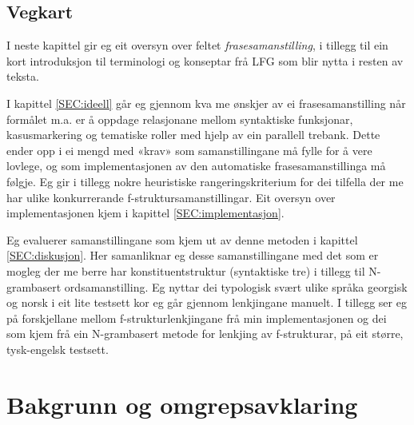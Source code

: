 \documentclass[12pt,a4paper,oneside,draft]{report}
\begin{document}
\section{Vegkart}
\label{sec-1.1}

I neste kapittel gir eg eit oversyn over feltet \emph{frasesamanstilling},
i tillegg til ein kort introduksjon til terminologi og konseptar frå
LFG som blir nytta i resten av teksta.

I kapittel \ref{SEC:ideell} går eg gjennom kva me ønskjer av ei
frasesamanstilling når formålet m.a. er å oppdage relasjonane mellom
syntaktiske funksjonar, kasusmarkering og tematiske roller med hjelp
av ein parallell trebank. Dette ender opp i ei mengd med «krav» som
samanstillingane må fylle for å vere lovlege, og som implementasjonen
av den automatiske frasesamanstillinga må følgje. Eg gir i tillegg
nokre heuristiske rangeringskriterium for dei tilfella der me har
ulike konkurrerande f-struktursamanstillingar. Eit oversyn over
implementasjonen kjem i kapittel \ref{SEC:implementasjon}.

Eg evaluerer samanstillingane som kjem ut av denne metoden i kapittel
\ref{SEC:diskusjon}. Her samanliknar eg desse samanstillingane med det
som er mogleg der me berre har konstituentstruktur (syntaktiske tre) i
tillegg til N-grambasert ordsamanstilling. Eg nyttar dei typologisk
svært ulike språka georgisk og norsk i eit lite testsett kor eg går
gjennom lenkjingane manuelt. I tillegg ser eg på forskjellane mellom
f-strukturlenkjingane frå min implementasjonen og dei som kjem frå ein
N-grambasert metode for lenkjing av f-strukturar, på eit større,
tysk-engelsk testsett.





\chapter{Bakgrunn og omgrepsavklaring}
\label{sec-2}

  \label{SEC:bakgrunn}

  
\end{document}
